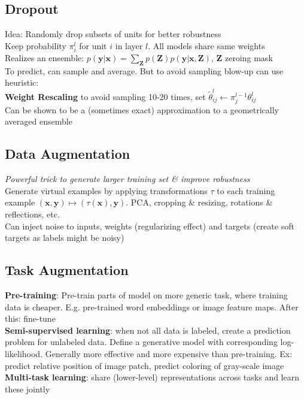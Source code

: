 \subsection*{Dropout}
Idea: Randomly drop subsets of units for better robustness\\
Keep probability $\pi_i^l$ for unit $i$ in layer $l$. All models share same weights\\
Realizes an ensemble: $p(\mathbf{y|x})=\sum_\mathbf Zp(\mathbf Z)p(\mathbf{y|x,Z})$, $\mathbf Z$ zeroing mask\\
To predict, can sample and average. But to avoid sampling blow-up can use heuristic:\\
\textbf{Weight Rescaling} to avoid sampling 10-20 times, set 
$\tilde{\theta}_{ij}^l \leftarrow \pi_j^{l-1}\theta_{ij}^l $\\
Can be shown to be a (sometimes exact) approximation to a geometrically averaged ensemble
\subsection*{Data Augmentation}
\textit{Powerful trick to generate larger training set \& improve robustness}\\
Generate virtual examples by applying transformations $\tau$ to each training example $(\mathbf{x},\mathbf{y})\mapsto (\tau(\mathbf{x}),\mathbf{y})$.
PCA, cropping & resizing, rotations & reflections, etc.\\
Can inject noise to inputs, weights (regularizing effect) and targets (create soft targets as labels might be noisy)
\subsection*{Task Augmentation}
\textbf{Pre-training}: Pre-train parts of model on more generic task, where training data is cheaper. E.g. pre-trained word embeddings or image feature maps. After this: fine-tune\\
\textbf{Semi-supervised learning}: when not all data is labeled, create a prediction problem for unlabeled data. Define a generative model with corresponding log-likelihood. Generally more effective and more expensive than pre-training. Ex: predict relative position of image patch, predict coloring of gray-scale image
\textbf{Multi-task learning}: share (lower-level) representations across tasks and learn these jointly

